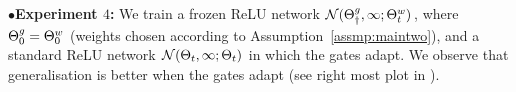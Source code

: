 $\bullet$\textbf{Experiment $4$:} We train a frozen ReLU network $\mathcal{N}({\Theta}^g_{\dagger},\infty;{\Theta}^w_t)$, where ${\Theta}^g_0={\Theta}^w_0$ (weights chosen according to Assumption~\ref{assmp:maintwo}), and a standard ReLU network $\mathcal{N}(\Theta_t,\infty;\Theta_t )$ in which the gates adapt. We observe that generalisation is better when the gates adapt (see right most plot in ).  

